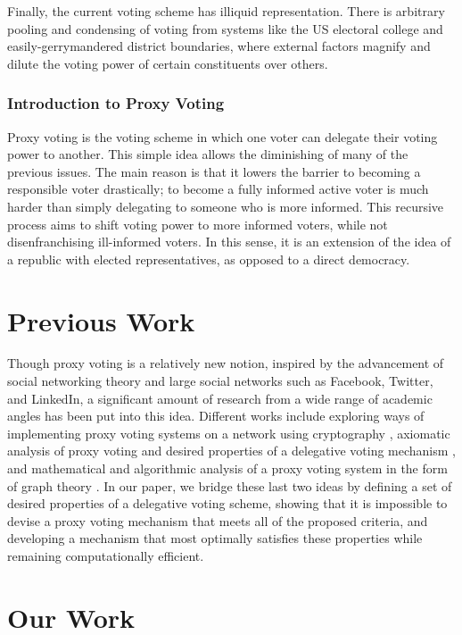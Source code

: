\documentclass[10pt]{article}
\theoremstyle{definition}
\begin{document}
Finally, the current voting scheme has illiquid representation. There is arbitrary pooling and condensing of voting from systems like the US electoral college and easily-gerrymandered district boundaries, where external factors magnify and dilute the voting power of certain constituents over others.

\subsubsection{Introduction to Proxy Voting}

Proxy voting is the voting scheme in which one voter can delegate their voting power to another. This simple idea allows the diminishing of many of the previous issues. The main reason is that it lowers the barrier to becoming a responsible voter drastically; to become a fully informed active voter is much harder than simply delegating to someone who is more informed. This recursive process aims to shift voting power to more informed voters, while not disenfranchising ill-informed voters. In this sense, it is an extension of the idea of a republic with elected representatives, as opposed to a direct democracy.

\section{Previous Work}

Though proxy voting is a relatively new notion, inspired by the advancement of social networking theory and large social networks such as Facebook, Twitter, and LinkedIn, a significant amount of research from a wide range of academic angles has been put into this idea. Different works include exploring ways of implementing proxy voting systems on a network using cryptography \cite{ben1}, axiomatic analysis of proxy voting and desired properties of a delegative voting mechanism \cite{ben2}, and mathematical and algorithmic analysis of a proxy voting system in the form of graph theory \cite{ben3}. In our paper, we bridge these last two ideas by defining a set of desired properties of a delegative voting scheme, showing that it is impossible to devise a proxy voting mechanism that meets all of the proposed criteria, and developing a mechanism that most optimally satisfies these properties while remaining computationally efficient.


\section{Our Work}
\end{document}
